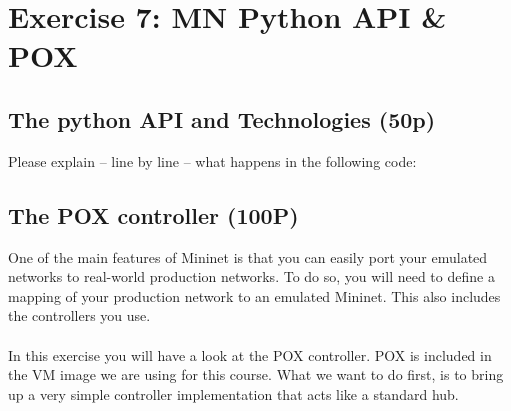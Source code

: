 \documentclass{llncs}
\begin{document}
%
\section{Exercise 7: MN Python API \& POX}
\subsection{The python API and Technologies (50p)}
Please explain – line by line – what happens in the following code:


\subsection{The POX controller (100P)}
One of the main features of Mininet is that you can easily port your 
emulated networks to real-world production networks. To do so, you will need 
to define a mapping of your production network to an emulated Mininet. This 
also includes the controllers you use. \\ \\
In this exercise you will have a look at the POX controller. POX is included 
in the VM image we are using for this course. What we want to do first, is 
to bring up a very simple controller implementation that acts like a 
standard hub.
\end{document}
